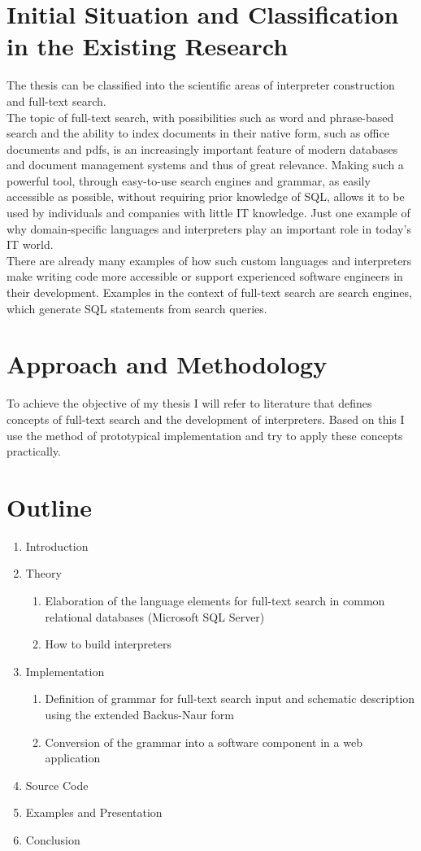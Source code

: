 \section{Initial Situation and Classification in the Existing Research}
The thesis can be classified into the scientific areas of interpreter construction and full-text search.\\
The topic of full-text search, with possibilities such as word and phrase-based search and the ability to index documents in their native form, such as office documents and pdfs, is an increasingly important feature of modern databases and document management systems and thus of great relevance. Making such a powerful tool, through easy-to-use search engines and grammar, as easily accessible as possible, without requiring prior knowledge of SQL, allows it to be used by individuals and companies with little IT knowledge. Just one example of why domain-specific languages and interpreters play an important role in today's IT world.\\
There are already many examples of how such custom languages and interpreters make writing code more accessible or support experienced software engineers in their development. Examples in the context of full-text search are search engines, which generate SQL statements from search queries.
\section{Approach and Methodology}
To achieve the objective of my thesis I will refer to literature that defines concepts of full-text search and the development of interpreters. Based on this I use the method of prototypical implementation and try to apply these concepts practically.
\section{Outline}
\begin{enumerate}
    \item Introduction
    \item Theory
    \begin{enumerate}
        \item Elaboration of the language elements for full-text search in common relational databases (Microsoft SQL Server)
        \item How to build interpreters
    \end{enumerate}
    \item Implementation
    \begin{enumerate}
        \item Definition of grammar for full-text search input and schematic description using the extended Backus-Naur form
        \item Conversion of the grammar into a software component in a web application
    \end{enumerate}
    \item Source Code
    \item Examples and Presentation
    \item Conclusion
\end{enumerate}
